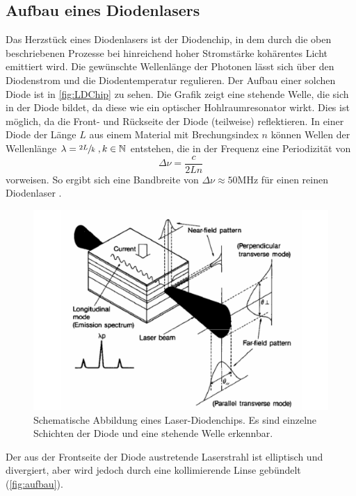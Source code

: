 \subsection{Aufbau eines Diodenlasers}
Das Herzstück eines Diodenlasers ist der Diodenchip, in dem durch die oben beschriebenen Prozesse bei hinreichend hoher Stromstärke kohärentes Licht emittiert wird. 
Die gewünschte Wellenlänge der Photonen lässt sich 
über den Diodenstrom und die Diodentemperatur regulieren. Der Aufbau einer solchen Diode ist in \autoref{fig:LDChip} zu sehen. Die Grafik zeigt eine stehende Welle, die sich in 
der Diode bildet, da diese wie ein optischer Hohlraumresonator wirkt. Dies ist möglich, da die Front- und Rückseite der Diode (teilweise) reflektieren. 
In einer Diode der Länge $L$ aus einem Material mit Brechungsindex $n$ können Wellen der Wellenlänge $\lambda = \sfrac{2L}{k}  \;,k \in \mathbb{N}$ entstehen, die in der Frequenz 
eine Periodizität von 
\begin{equation}
    \label{eqn:delta_nu}
    \Delta \nu = \frac{c}{2Ln}
\end{equation}  
vorweisen. So ergibt sich eine Bandbreite von $\Delta \nu \approx 50 \unit{\mega\hertz}$ für einen reinen Diodenlaser \cite{diode_laser_spectroscopy}. 

\begin{figure}
    \centering
    \includegraphics[scale=0.4]{content/pics/LDChip.png}
    \caption{Schematische Abbildung eines Laser-Diodenchips. Es sind einzelne Schichten der Diode und eine stehende Welle erkennbar. \cite{diode_laser_spectroscopy}}
    \label{fig:LDChip}
\end{figure}
Der aus der Frontseite der Diode austretende Laserstrahl ist elliptisch und divergiert, aber wird jedoch durch eine kollimierende Linse gebündelt (\autoref{fig:aufbau}). 

